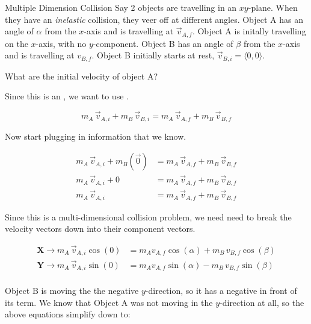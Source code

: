\begin{example}[]{Multiple Dimension Collision}
  Say 2 objects are travelling in an $xy$-plane.
  When they have an \emph{inelastic} collision, they veer off at different angles.
  Object A has an angle of $\alpha$ from the $x$-axis and is travelling at $\vec{v}_{A,f}$.
  Object A is initally travelling on the $x$-axis, with no $y$-component.
  Object B has an angle of $\beta$ from the $x$-axis and is travelling at $v_{B,f}$.
  Object B initially starts at rest, $\vec{v}_{B,i} = \langle 0, 0 \rangle$.

  What are the initial velocity of object A?

  \tcblower

  Since this is an , we want to use .

  \begin{equation*}
    m_{A} \, \vec{v}_{A,i} + m_{B} \, \vec{v}_{B,i} = m_{A} \, \vec{v}_{A,f} + m_{B} \, \vec{v}_{B,f}
  \end{equation*}

  Now start plugging in information that we know.

  \begin{align*}
    m_{A} \, \vec{v}_{A,i} + m_{B} \left( \vec{0} \right) &= m_{A} \, \vec{v}_{A,f} + m_{B} \, \vec{v}_{B,f} \\
    m_{A} \, \vec{v}_{A,i} + 0 &= m_{A} \, \vec{v}_{A,f} + m_{B} \, \vec{v}_{B,f} \\
    m_{A} \, \vec{v}_{A,i} &= m_{A} \, \vec{v}_{A,f} + m_{B} \, \vec{v}_{B,f}
  \end{align*}

  Since this is a multi-dimensional collision problem, we need need to break the velocity vectors down into their component vectors.

  \begin{align*}
    \mathbf{X} \rightarrow m_{A} \, \vec{v}_{A,i} \cos (0) &= m_{A} v_{A,f} \cos (\alpha) + m_{B} \, v_{B,f} \cos (\beta) \\
    \mathbf{Y} \rightarrow m_{A} \, \vec{v}_{A,i} \sin (0) &= m_{A} v_{A,f} \sin (\alpha) - m_{B} \, v_{B,f} \sin (\beta) \\
  \end{align*}

  Object B is moving the the negative $y$-direction, so it has a negative in front of its term.
  We know that Object A was not moving in the $y$-direction at all, so the above equations simplify down to:


\end{example}
